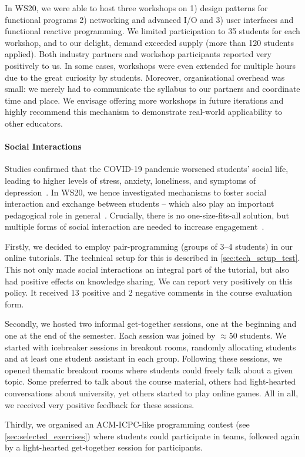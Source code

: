 In WS20,
we were able to host three workshops on 1) design patterns
for functional programs 2) networking and advanced I/O and 3) user interfaces and functional reactive programming.
We limited participation to 35 students for each workshop,
and to our delight, demand exceeded supply (more than 120 students applied).
Both industry partners and workshop participants
reported very positively to us.
In some cases,
workshops were even extended for multiple hours due to the great curiosity by students.
Moreover, organisational overhead was small:
we merely had to communicate the syllabus to our partners and coordinate time and place.
We envisage offering more workshops in future iterations and highly recommend this mechanism to demonstrate real-world applicability to other educators.

\paragraph{Social Interactions}
Studies confirmed that the COVID-19 pandemic
worsened students' social life,
leading to higher levels of stress, anxiety, loneliness, and symptoms of depression~\cite{students_lockdown1}.
In WS20,
we hence investigated mechanisms
to foster social interaction and exchange between students
-- which also play an important pedagogical role in general~\cite{impact_social_interaction}.
Crucially,
there is no one-size-fits-all solution,
but multiple forms of social interaction
are needed to increase engagement~\cite{onlineengagement3,onlineengagement2}.

Firstly, we decided to employ pair-programming (groups of 3--4 students)
in our online tutorials.
The technical setup for this is described in \cref{sec:tech_setup_test}.
This not only made social interactions an integral part of the tutorial,
but also had positive effects on knowledge sharing.
We can report very positively on this policy.
It received 13 positive and 2 negative comments in the course evaluation form.

Secondly, we hosted two informal get-together sessions,
one at the beginning and one at the end of the semester.
Each session was joined by $\approx 50$ students.
We started with icebreaker sessions in breakout rooms,
randomly allocating students and at least one student assistant in each group.
Following these sessions,
we opened thematic breakout rooms where students
could freely talk about a given topic.
Some preferred to talk about the course material, others had
light-hearted conversations about university, yet others started to play online games.
All in all, we received very positive feedback for these sessions.

Thirdly, we organised an
ACM-ICPC-like programming contest (see \cref{sec:selected_exercises})
where students could participate in teams,
followed again by a light-hearted get-together session
for participants.


